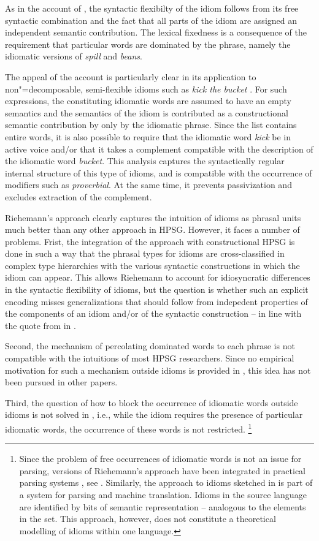 \documentclass[output=paper]{langsci/langscibook}
\begin{document}
As in the account of \cite{KE94a}, the syntactic flexibilty of the idiom follows from its free syntactic combination and the fact that all parts of the idiom are assigned an independent semantic contribution. The lexical fixedness is a consequence of the requirement that particular words are dominated by the phrase, namely the idiomatic versions of \emph{spill} and \emph{beans}.

The appeal of the account is particularly clear in its application to non"=de\-com\-posable, semi-flexible idioms such as \emph{kick the bucket} \citep[]{Riehemann2001a}. 
For such expressions, the constituting idiomatic words are assumed to have an empty semantics and the semantics of the idiom is contributed as a constructional semantic contribution by only by the idiomatic phrase. 
Since the  list contains entire words, it is also possible to require that the idiomatic word \emph{kick} be in active voice and/or that it takes a complement compatible with the description of the idiomatic word \emph{bucket}.
This analysis captures the syntactically regular internal structure of this type of idioms, and is compatible with the occurrence of modifiers such as \emph{proverbial}. At the same time, it prevents passivization and excludes extraction of the complement.

Riehemann's approach clearly captures the intuition of idioms as phrasal units much better than any other approach in HPSG. 
However, it faces a number of problems.
Frist, the integration of the approach with constructional HPSG is done in such a way that the phrasal types for idioms are cross-classified in complex type hierarchies with the various syntactic constructions in which the idiom can appear. 
This allows Riehemann to account for idiosyncratic differences in the syntactic flexibility of idioms, but the question is whether such an explicit encoding misses generalizations that should follow from indepedent properties of the components of an idiom and/or of the syntactic construction -- in line with the quote from \cite{NSW94a} in .


Second, the mechanism of percolating dominated words to each phrase is not compatible with the intuitions of most HPSG researchers. 
Since no empirical motivation for such a mechanism outside idioms is provided in \cite{Riehemann2001a}, this idea has not been pursued in other papers. 

Third, the question of how to block the occurrence of idiomatic words outside idioms is not solved in \cite{Riehemann2001a}, i.e., while the idiom requires the presence of particular idiomatic words, the occurrence of these words is not restricted.%
\footnote{Since the problem of free occurrences of idiomatic words is not an issue for parsing, versions of Riehemann's approach have been integrated in practical parsing systems \citep{Villavicencio:Copestake:02}, see . 
Similarly, the approach to idioms sketched in \cite{Flickinger:15Slides2} 
is part of a system for parsing and machine translation. Idioms in the source language are identified by bits of semantic representation -- analogous to the elements in the  set. This approach, however, does not constitute a theoretical modelling of idioms within one language.}
\end{document}
